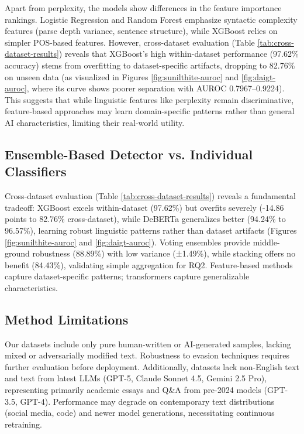 \documentclass[11pt]{article}
\begin{document}
Apart from perplexity, the models show differences in the feature importance rankings. Logistic Regression and Random Forest emphasize syntactic complexity features (parse depth variance, sentence structure), while XGBoost relies on simpler POS-based features. However, cross-dataset evaluation (Table \ref{tab:cross-dataset-results}) reveals that XGBoost's high within-dataset performance (97.62\% accuracy) stems from overfitting to dataset-specific artifacts, dropping to 82.76\% on unseen data (as visualized in Figures \ref{fig:sunilthite-auroc} and \ref{fig:daigt-auroc}, where its curve shows poorer separation with AUROC 0.7967--0.9224).
This suggests that while linguistic features like perplexity remain discriminative, feature-based approaches may learn domain-specific patterns rather than general AI characteristics, limiting their real-world utility.

\subsection{Ensemble-Based Detector vs. Individual Classifiers}
\label{sec:ensemble-based-detector-discussion}
Cross-dataset evaluation (Table \ref{tab:cross-dataset-results}) reveals a fundamental tradeoff: XGBoost excels within-dataset (97.62\%) but overfits severely (-14.86 points to 82.76\% cross-dataset), while DeBERTa generalizes better (94.24\% to 96.57\%), learning robust linguistic patterns rather than dataset artifacts (Figures \ref{fig:sunilthite-auroc} and \ref{fig:daigt-auroc}). Voting ensembles provide middle-ground robustness (88.89\%) with low variance (±1.49\%), while stacking offers no benefit (84.43\%), validating simple aggregation for RQ2. Feature-based methods capture dataset-specific patterns; transformers capture generalizable characteristics.

\subsection{Method Limitations}
\label{sec:method-limitations}
Our datasets include only pure human-written or AI-generated samples, lacking mixed or adversarially modified text. Robustness to evasion techniques requires further evaluation before deployment. Additionally, datasets lack non-English text and text from latest LLMs (GPT-5, Claude Sonnet 4.5, Gemini 2.5 Pro), representing primarily academic essays and Q\&A from pre-2024 models (GPT-3.5, GPT-4). Performance may degrade on contemporary text distributions (social media, code) and newer model generations, necessitating continuous retraining.
\end{document}
